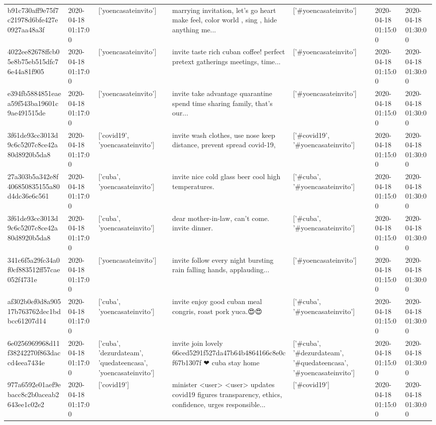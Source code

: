\begin{tabular}{lllllll}
b91c730aff9e75f7c21978d6bfe427e0927aa48a3f & 2020-04-18 01:17:00 & ['yoencasateinvito'] & marrying invitation, let's go heart 💖 make feel, color world , sing , hide anything me... & ['#yoencasateinvito'] & 2020-04-18 01:15:00 & 2020-04-18 01:30:00 \\
4022ee82678ffcb05e8b75eb515dfc76e44a81f905 & 2020-04-18 01:17:00 & ['yoencasateinvito'] & invite taste rich cuban coffee! perfect pretext gatherings meetings, time... & ['#yoencasateinvito'] & 2020-04-18 01:15:00 & 2020-04-18 01:30:00 \\
e394fb5884851eaea59f543ba19601c9ae491515de & 2020-04-18 01:17:00 & ['yoencasateinvito'] & invite take advantage quarantine spend time sharing family, that's our... & ['#yoencasateinvito'] & 2020-04-18 01:15:00 & 2020-04-18 01:30:00 \\
3f61de93cc3013d9c6c5207c8ce42a80d8920b5da8 & 2020-04-18 01:17:00 & ['covid19', 'yoencasateinvito'] & invite wash clothes, use nose keep distance, prevent spread covid-19, & ['#covid19', '#yoencasateinvito'] & 2020-04-18 01:15:00 & 2020-04-18 01:30:00 \\
27a303b5a342e8f406850835155a80d4dc36e6c561 & 2020-04-18 01:17:00 & ['cuba', 'yoencasateinvito'] & invite nice cold glass beer cool high temperatures. & ['#cuba', '#yoencasateinvito'] & 2020-04-18 01:15:00 & 2020-04-18 01:30:00 \\
3f61de93cc3013d9c6c5207c8ce42a80d8920b5da8 & 2020-04-18 01:17:00 & ['cuba', 'yoencasateinvito'] & dear mother-in-law, can't come. invite dinner. & ['#cuba', '#yoencasateinvito'] & 2020-04-18 01:15:00 & 2020-04-18 01:30:00 \\
341c6f5a29fc34a0f0cf883512ff57cae052f4731e & 2020-04-18 01:17:00 & ['yoencasateinvito'] & invite follow every night bursting rain falling hands, applauding... & ['#yoencasateinvito'] & 2020-04-18 01:15:00 & 2020-04-18 01:30:00 \\
af302b0ef0d8a90517b763762dec1bdbcc61207d14 & 2020-04-18 01:17:00 & ['cuba', 'yoencasateinvito'] & invite enjoy good cuban meal congris, roast pork yuca.😍😍 & ['#cuba', '#yoencasateinvito'] & 2020-04-18 01:15:00 & 2020-04-18 01:30:00 \\
6e0256969968d11f38242270f863daccd4eea7434e & 2020-04-18 01:17:00 & ['cuba', 'dezurdateam', 'quedateencasa', 'yoencasateinvito'] & invite join lovely 66ced5291f527da47b64b4864166c8e0cf67b1307f ❤ cuba stay home & ['#cuba', '#dezurdateam', '#quedateencasa', '#yoencasateinvito'] & 2020-04-18 01:15:00 & 2020-04-18 01:30:00 \\
977a6592e01aef9ebacc8c2b0aceab2643ee1c02e2 & 2020-04-18 01:17:00 & ['covid19'] & minister <user> <user> updates covid19 figures transparency, ethics, confidence, urges responsible... & ['#covid19'] & 2020-04-18 01:15:00 & 2020-04-18 01:30:00 \\

\end{tabular}

